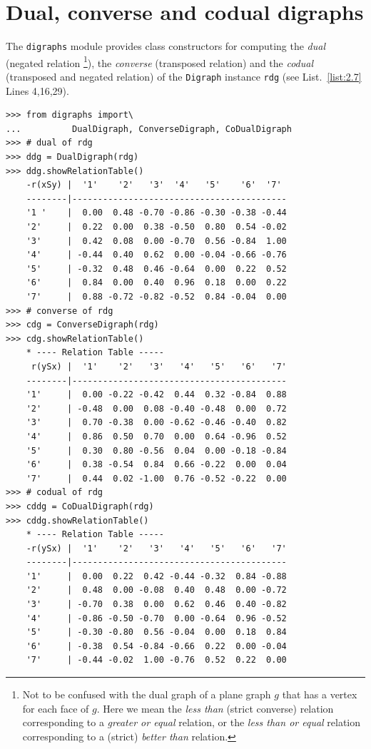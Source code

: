 \section{Dual, converse and codual digraphs}
\label{sec:2.6}

The \texttt{digraphs} module provides class constructors for computing the \emph{dual} (negated relation \footnote{Not to be confused with the dual graph of a plane graph $g$ that has a vertex for each face of $g$. Here we mean the \emph{less than} (strict converse) relation corresponding to a \emph{greater or equal} relation, or the \emph{less than or equal} relation corresponding to a (strict) \emph{better than} relation.}), the \emph{converse} (transposed relation) and the \emph{codual} (transposed and negated relation) of the \texttt{Digraph} instance \texttt{rdg} (see List.~\vref{list:2.7} Lines 4,16,29). 
\begin{lstlisting}[caption={Computing associated dual, converse and codual digraphs},label=list:2.7]
>>> from digraphs import\
...          DualDigraph, ConverseDigraph, CoDualDigraph
>>> # dual of rdg
>>> ddg = DualDigraph(rdg)
>>> ddg.showRelationTable()
    -r(xSy) |  '1'    '2'   '3'  '4'   '5'    '6'  '7'	  
    --------|------------------------------------------
    '1 '    |  0.00  0.48 -0.70 -0.86 -0.30 -0.38 -0.44	 
    '2'     |  0.22  0.00  0.38 -0.50  0.80  0.54 -0.02	 
    '3'     |  0.42  0.08  0.00 -0.70  0.56 -0.84  1.00	 
    '4'     | -0.44  0.40  0.62  0.00 -0.04 -0.66 -0.76	 
    '5'     | -0.32  0.48  0.46 -0.64  0.00  0.22  0.52	 
    '6'     |  0.84  0.00  0.40  0.96  0.18  0.00  0.22	 
    '7'     |  0.88 -0.72 -0.82 -0.52  0.84 -0.04  0.00
>>> # converse of rdg
>>> cdg = ConverseDigraph(rdg)
>>> cdg.showRelationTable()
    * ---- Relation Table -----
     r(ySx) |  '1'    '2'   '3'   '4'   '5'   '6'   '7'	  
    --------|------------------------------------------
    '1'     |  0.00 -0.22 -0.42  0.44  0.32 -0.84  0.88	 
    '2'     | -0.48  0.00  0.08 -0.40 -0.48  0.00  0.72	 
    '3'     |  0.70 -0.38  0.00 -0.62 -0.46 -0.40  0.82	 
    '4'     |  0.86  0.50  0.70  0.00  0.64 -0.96  0.52	 
    '5'     |  0.30  0.80 -0.56  0.04  0.00 -0.18 -0.84	 
    '6'     |  0.38 -0.54  0.84  0.66 -0.22  0.00  0.04	 
    '7'     |  0.44  0.02 -1.00  0.76 -0.52 -0.22  0.00	 
>>> # codual of rdg
>>> cddg = CoDualDigraph(rdg)
>>> cddg.showRelationTable()
    * ---- Relation Table -----
    -r(ySx) |  '1'    '2'   '3'   '4'   '5'   '6'   '7'	    
    --------|------------------------------------------
    '1'     |  0.00  0.22  0.42 -0.44 -0.32  0.84 -0.88	 
    '2'     |  0.48  0.00 -0.08  0.40  0.48  0.00 -0.72	 
    '3'     | -0.70  0.38  0.00  0.62  0.46  0.40 -0.82	 
    '4'     | -0.86 -0.50 -0.70  0.00 -0.64  0.96 -0.52	 
    '5'     | -0.30 -0.80  0.56 -0.04  0.00  0.18  0.84	 
    '6'     | -0.38  0.54 -0.84 -0.66  0.22  0.00 -0.04	 
    '7'     | -0.44 -0.02  1.00 -0.76  0.52  0.22  0.00	 
\end{lstlisting}

